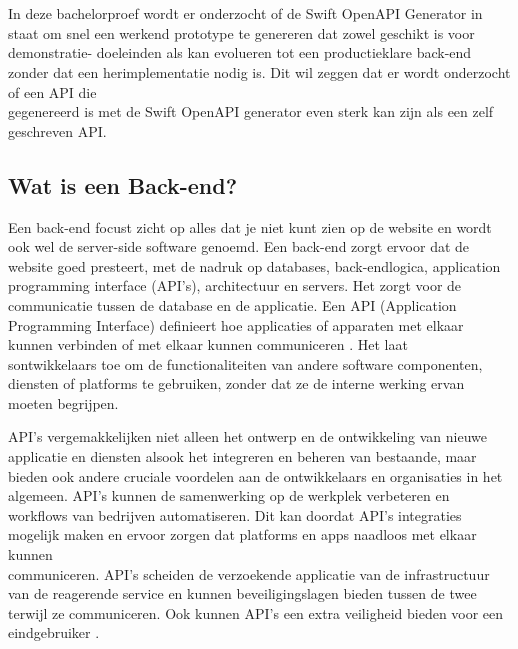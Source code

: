 \chapter{}%
\label{ch:stand-van-zaken}



In deze bachelorproef wordt er onderzocht of de Swift OpenAPI Generator in staat om snel een werkend prototype te genereren dat zowel geschikt is voor demonstratie- doeleinden als kan evolueren tot een productieklare back-end zonder dat een herimplementatie nodig is. Dit wil zeggen dat er wordt onderzocht of een API die \\gegenereerd is met de Swift OpenAPI generator even sterk kan zijn als een zelf \\geschreven API.

\section{Wat is een Back-end?}

Een back-end focust zicht op alles dat je niet kunt zien op de website en wordt ook wel de server-side software genoemd. Een back-end zorgt ervoor dat de website goed presteert, met de nadruk op databases, back-endlogica, application \\ programming interface (API's), architectuur en servers. Het zorgt voor de \\communicatie tussen de database en de applicatie. 
Een API (Application \\Programming Interface) definieert hoe applicaties of apparaten met elkaar \\kunnen verbinden of met elkaar kunnen communiceren \autocite{IBM}. Het laat \\sontwikkelaars toe om de functionaliteiten van andere software componenten, \\diensten of platforms te gebruiken, zonder dat ze de interne werking ervan moeten begrijpen.

API’s vergemakkelijken niet alleen het ontwerp en de ontwikkeling van nieuwe \\applicatie en diensten alsook het integreren en beheren van bestaande, maar \\bieden ook andere cruciale voordelen aan de ontwikkelaars en organisaties in het \\algemeen. API’s kunnen de samenwerking op de werkplek verbeteren en \\workflows van bedrijven automatiseren. Dit kan doordat API’s integraties mogelijk maken en ervoor zorgen dat platforms en apps naadloos met elkaar kunnen \\communiceren. API’s scheiden de verzoekende applicatie van de infrastructuur van de reagerende service en kunnen beveiligingslagen bieden tussen de twee terwijl ze communiceren. Ook kunnen API’s een extra veiligheid bieden voor een eindgebruiker \autocite{IBMa}.

